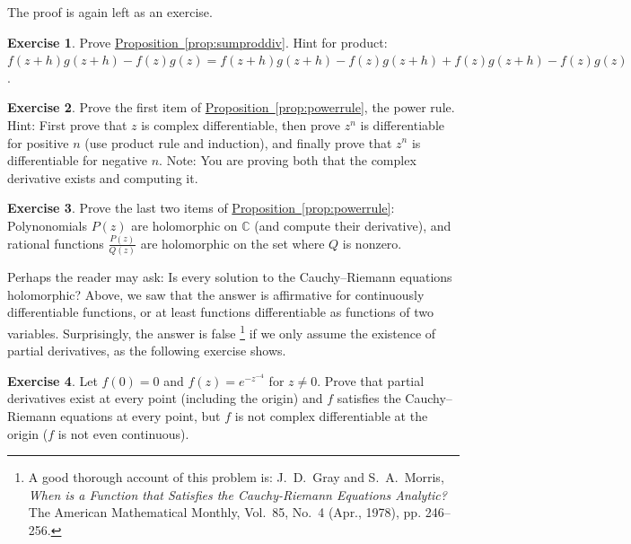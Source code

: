 \documentclass[12pt,openany]{book}
\newcommand{\C}{{\mathbb{C}}}
\theoremstyle{plain}
\theoremstyle{remark}
\theoremstyle{definition}
\newenvironment{exbox}{%
    \def\FrameCommand{\vrule width 1pt \relax\hspace{10pt}}%
    \MakeFramed{\advance\hsize-\width\FrameRestore}%
}{%
    \endMakeFramed
}
\theoremstyle{exercise}
\newtheorem{exercise}{Exercise}[section]
\theoremstyle{example}
\newcommand{\propref}[1]{\hyperref[#1]{Proposition~\ref*{#1}}}
\begin{document}
The proof is again left as an exercise.

\begin{exbox}
\begin{exercise}
Prove \propref{prop:sumproddiv}.
Hint for product: 
$f(z+h)g(z+h) - f(z)g(z) =
f(z+h)g(z+h) - f(z)g(z+h) +
f(z)g(z+h) - f(z)g(z)$.
\end{exercise}

\begin{exercise}
Prove the first item of \propref{prop:powerrule}, the power rule.
Hint: First prove that $z$ is complex differentiable,
then prove $z^n$ is differentiable for positive $n$ (use product rule and
induction), and finally prove
that $z^n$ is differentiable for negative $n$.
Note: You are proving both that the complex derivative exists and
computing it.
\end{exercise}

\begin{exercise}
Prove the last two items of \propref{prop:powerrule}:
Polynonomials $P(z)$ are holomorphic on $\C$ (and compute their derivative),
and rational functions
$\frac{P(z)}{Q(z)}$ are holomorphic on the set where $Q$ is nonzero.
\end{exercise}
\end{exbox}

Perhaps the reader may ask:
Is every solution to
the Cauchy--Riemann equations holomorphic?  Above, we saw that the answer
is affirmative for continuously differentiable functions, or at least
functions differentiable as functions of two variables.
Surprisingly, the answer is false%
\footnote{%
A good thorough account of this problem is:
J.\ D.\ Gray and  S.\ A.\ Morris,
\emph{When is a Function that Satisfies the Cauchy-Riemann Equations
Analytic?}  The American Mathematical Monthly, Vol.\ 85, No.\ 4 (Apr.,
1978), pp. 246--256.} if we only assume the existence of partial derivatives,
as the following exercise shows.

\begin{exbox}
\begin{exercise} \label{exercise:nonholCRsol}
Let $f(0) = 0$ and $f(z) = e^{-z^{-4}}$ for $z \not=0$.  Prove that partial
derivatives exist at every point (including the origin) and $f$
satisfies the Cauchy--Riemann equations at every point,
but $f$ is not complex differentiable at the origin ($f$ is not
even continuous).
\end{exercise}
\end{exbox}
\end{document}
